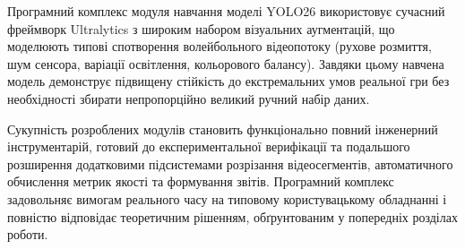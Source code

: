 \begin{unnumbered}
Програмний комплекс модуля навчання моделі \gls{YOLO}26 використовує сучасний
фреймворк Ultralytics з широким набором візуальних аугментацій, що моделюють
типові спотворення волейбольного відеопотоку (рухове розмиття, шум сенсора,
варіації освітлення, кольорового балансу). Завдяки цьому навчена модель демонструє
підвищену стійкість до екстремальних умов реальної гри без необхідності збирати
непропорційно великий ручний набір даних.

Сукупність розроблених модулів становить функціонально повний інженерний інструментарій,
готовий до експериментальної верифікації та подальшого розширення додатковими
підсистемами розрізання відеосегментів, автоматичного обчислення метрик якості та
формування звітів. Програмний комплекс задовольняє вимогам реального часу на типовому
користувацькому обладнанні і повністю відповідає теоретичним рішенням, обґрунтованим у
попередніх розділах роботи.

\end{unnumbered}
